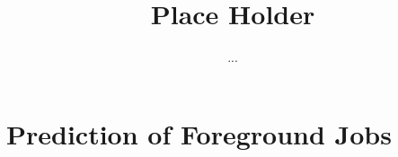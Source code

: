 \documentclass[sigplan,10pt]{acmart}
\title{Place Holder}
\author{...}
\begin{document}
    \maketitle

    \section{Prediction of Foreground Jobs}
\end{document}
